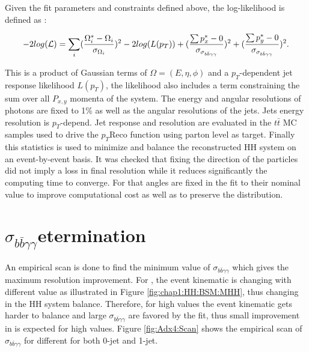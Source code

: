 Given the fit parameters and constraints defined above, the log-likelihood is defined as :

\begin{equation}
    \centering
    -2log(\mathcal{L}) = \sum_{i} (\frac{\Omega_i^*-\Omega_i}{\sigma_{\Omega_i}})^2 - 2log(L(p_T)) + (\frac{ \sum p_x^*-0}{\sigma_{\sigma_{b\bar{b}\gamma\gamma}}})^2 + (\frac{ \sum p_y^*-0}{\sigma_{\sigma_{b\bar{b}\gamma\gamma}}})^2.
\end{equation}

This is a product of Gaussian terms of $\Omega = (E, \eta, \phi)$ and a $p_T$-dependent jet response likelihood $L(p_T)$, the likelihood also includes a term constraining the sum over all $P_{x,y}$ momenta of the system. The energy and angular resolutions of photons are fixed to 1\% as well as the angular resolutions of the jets. Jets energy resolution is $p_T$-depend. Jet response and resolution are evaluated in the $t\bar{t}$ MC samples used to drive the $p_T$Reco function using parton level as target. Finally this statistics is used to minimize and balance the reconstructed HH system on an event-by-event basis. It was checked that fixing the direction of the particles did not imply a loss in final resolution while it reduces significantly the computing time to converge. For that angles are fixed in the fit to their nominal value to improve computational cost as well as to preserve the \myy distribution.  
\section{\texorpdfstring{$\sigma_{b\bar{b}\gamma\gamma}$} determination}
An empirical scan is done to find the minimum value of $\sigma_{b\bar{b}\gamma\gamma}$ which gives the maximum \mbb resolution improvement. For \HHyybb, the event kinematic is changing with different \kl value as illustrated in Figure \ref{fig:chap1:HH:BSM:MHH}, thus changing in the HH system balance. Therefore, for high \kl values the event kinematic gets harder to balance and large $\sigma_{b\bar{b}\gamma\gamma}$ are favored by the fit, thus small improvement in \mbb is expected for high \kl values. Figure \ref{fig:Adx4:Scan} shows the empirical scan of $\sigma_{b\bar{b}\gamma\gamma}$ for different \kl for both 0-jet and 1-jet. 

